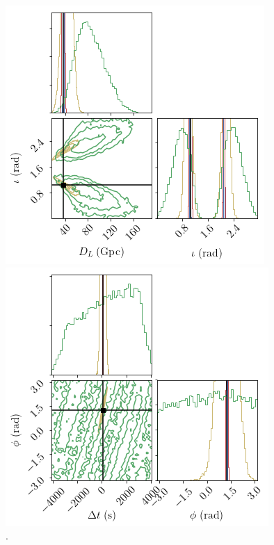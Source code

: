 \documentclass[aps,showpacs,twocolumn,prd,superscriptaddress,nofootinbib]{revtex4-1}
\begin{document}
\begin{figure}
\begin{minipage}{.32\linewidth}
      \includegraphics[width=.99\linewidth]{../plots/corner_smbh_case9_hm_tseries_Dinc.png}
   \end{minipage}
   \begin{minipage}{.32\linewidth}
      \includegraphics[width=.99\linewidth]{../plots/corner_smbh_case9_hm_tseries_tphi.png}
   \end{minipage}
  \caption{.}
  \label{fig:smbhCornerZoomHMCase9}
\end{figure}
\end{document}
